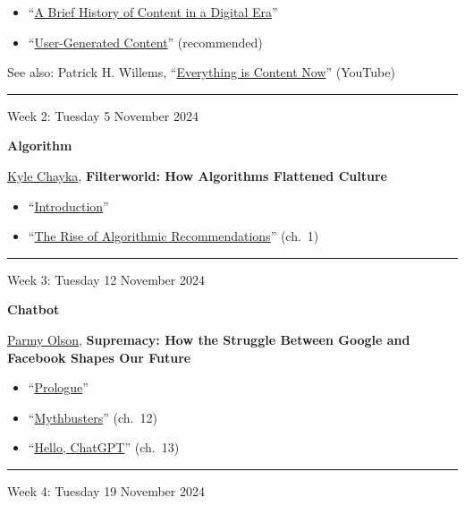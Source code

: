 \documentclass[
  letterpaper,
  DIV=11,
  numbers=noendperiod,
  oneside]{scrartcl}
\providecommand{\tightlist}{%
  \setlength{\itemsep}{0pt}\setlength{\parskip}{0pt}}\usepackage{longtable,booktabs,array}
\begin{document}
\begin{itemize}
\tightlist
\item
  ``\href{pdf/eichhorn-content-ch1.pdf}{A Brief History of Content in a
  Digital Era}''
\item
  ``\href{pdf/eichhorn-content-ch2.pdf}{User-Generated Content}''
  (recommended)
\end{itemize}

See also: Patrick H. Willems,
``\href{https://youtu.be/hAtbFwzZp6Y}{Everything is Content Now}''
(YouTube)

\begin{center}\rule{0.5\linewidth}{0.5pt}\end{center}

Week 2: Tuesday 5 November 2024

\textbf{Algorithm}

\href{https://www.kylechayka.com/}{Kyle Chayka}, \textbf{Filterworld:
How Algorithms Flattened Culture}

\begin{itemize}
\tightlist
\item
  ``\href{pdf/filterworld-intro.pdf}{Introduction}''
\item
  ``\href{pdf/filterworld-ch1.pdf}{The Rise of Algorithmic
  Recommendations}'' (ch.~1)
\end{itemize}

\begin{center}\rule{0.5\linewidth}{0.5pt}\end{center}

Week 3: Tuesday 12 November 2024

\textbf{Chatbot}

\href{https://x.com/parmy}{Parmy Olson}, \textbf{Supremacy: How the
Struggle Between Google and Facebook Shapes Our Future}

\begin{itemize}
\tightlist
\item
  ``\href{pdf/supremacy-prologue.pdf}{Prologue}''
\item
  ``\href{pdf/supremacy-ch12.pdf}{Mythbusters}'' (ch.~12)
\item
  ``\href{pdf/supremacy-ch13.pdf}{Hello, ChatGPT}'' (ch.~13)
\end{itemize}

\begin{center}\rule{0.5\linewidth}{0.5pt}\end{center}

Week 4: Tuesday 19 November 2024
\end{document}
